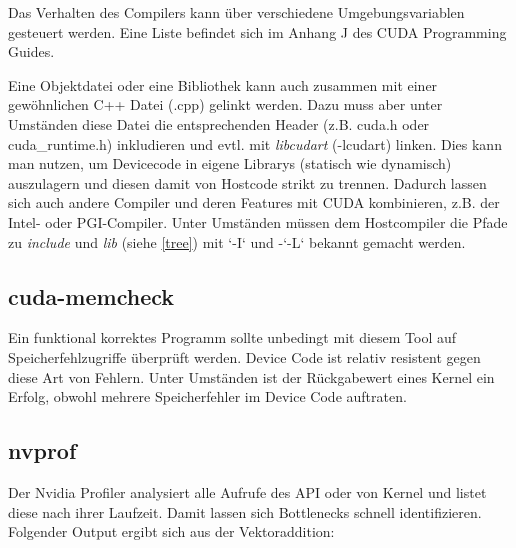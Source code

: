 			Das Verhalten des Compilers kann über verschiedene Umgebungsvariablen gesteuert werden. Eine Liste befindet sich im Anhang J des CUDA Programming Guides. \autocite{cudaPG} 
		
			Eine Objektdatei oder eine Bibliothek kann auch zusammen mit einer gewöhnlichen C++ Datei (.cpp) gelinkt werden. Dazu muss aber unter Umständen diese Datei die entsprechenden Header (z.B. cuda.h oder cuda{\_}runtime.h) inkludieren und evtl. mit \textit{libcudart} (-lcudart) linken. Dies kann man nutzen, um Devicecode in eigene Librarys (statisch wie dynamisch) auszulagern und diesen damit von Hostcode strikt zu trennen. Dadurch lassen sich auch andere Compiler und deren Features mit CUDA kombinieren, z.B. der Intel- oder PGI-Compiler. Unter Umständen müssen dem Hostcompiler die Pfade zu \textit{include} und \textit{lib} (siehe \ref{tree}) mit \li`-I` und -\li`-L` bekannt gemacht werden.
			
			\subsection{cuda-memcheck}
            Ein funktional korrektes Programm sollte unbedingt mit diesem Tool auf Speicherfehlzugriffe überprüft werden. Device Code ist relativ resistent gegen diese Art von Fehlern. Unter Umständen ist der Rückgabewert eines \Gls{Kernel} ein Erfolg, obwohl mehrere Speicherfehler im Device Code auftraten.		
			
			\subsection{nvprof}
            Der Nvidia Profiler analysiert alle Aufrufe des \Gls{API} oder von \Gls{Kernel} und listet diese nach ihrer Laufzeit. Damit lassen sich Bottlenecks schnell identifizieren. Folgender Output ergibt sich aus der Vektoraddition:
            
